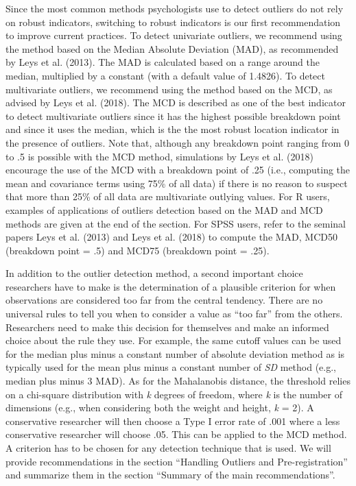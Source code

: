 \documentclass[man,floatsintext]{apa6}
\begin{document}
Since the most common methods psychologists use to detect outliers do not rely on robust indicators, switching to robust indicators is our first recommendation to improve current practices. To detect univariate outliers, we recommend using the method based on the Median Absolute Deviation (MAD), as recommended by Leys et al. (2013). The MAD is calculated based on a range around the median, multiplied by a constant (with a default value of 1.4826). To detect multivariate outliers, we recommend using the method based on the MCD, as advised by Leys et al. (2018). The MCD is described as one of the best indicator to detect multivariate outliers since it has the highest possible breakdown point and since it uses the median, which is the the most robust location indicator in the presence of outliers. Note that, although any breakdown point ranging from 0 to .5 is possible with the MCD method, simulations by Leys et al. (2018) encourage the use of the MCD with a breakdown point of .25 (i.e., computing the mean and covariance terms using 75\% of all data) if there is no reason to suspect that more than 25\% of all data are multivariate outlying values. For R users, examples of applications of outliers detection based on the MAD and MCD methods are given at the end of the section. For SPSS users, refer to the seminal papers Leys et al. (2013) and Leys et al. (2018) to compute the MAD, MCD50 (breakdown point = .5) and MCD75 (breakdown point = .25).

In addition to the outlier detection method, a second important choice researchers have to make is the determination of a plausible criterion for when observations are considered too far from the central tendency. There are no universal rules to tell you when to consider a value as \enquote{too far} from the others. Researchers need to make this decision for themselves and make an informed choice about the rule they use. For example, the same cutoff values can be used for the median plus minus a constant number of absolute deviation method as is typically used for the mean plus minus a constant number of \emph{SD} method (e.g., median plus minus 3 MAD). As for the Mahalanobis distance, the threshold relies on a chi-square distribution with \emph{k} degrees of freedom, where \emph{k} is the number of dimensions (e.g., when considering both the weight and height, \emph{k }= 2). A conservative researcher will then choose a Type I error rate of .001 where a less conservative researcher will choose .05. This can be applied to the MCD method. A criterion has to be chosen for any detection technique that is used. We will provide recommendations in the section \enquote{Handling Outliers and Pre-registration} and summarize them in the section \enquote{Summary of the main recommendations}.
\end{document}
